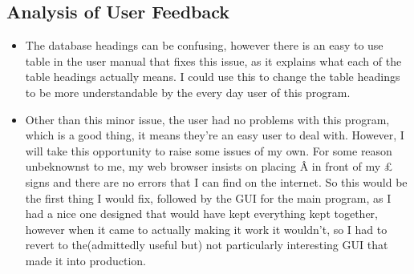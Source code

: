 \documentclass[
11pt, %
a4paper, %
oneside, %
headinclude,footinclude, %
BCOR5mm, %
]{scrartcl}
\begin{document}
\subsection{Analysis of User Feedback}
\begin{itemize}
	\item The database headings can be confusing, however there is an easy to use table in the user manual that fixes this issue, as it explains what each of the table headings actually means.	I could use this to change the table headings to be more understandable by the every day user of this program.
	\item Other than this minor issue, the user had no problems with this program, which is a good thing, it means they're an easy user to deal with. However, I will take this opportunity to raise some issues of my own. For some reason unbeknownst to me, my web browser insists on placing \^{A} in front of my £ signs and there are no errors that I can find on the internet. So this would be the first thing I would fix, followed by the GUI for the main program, as I had a nice one designed that would have kept everything kept together, however when it came to actually making it work it wouldn't, so I had to revert to the(admittedly useful but) not particularly interesting GUI that made it into production.
\end{itemize}
\end{document}
